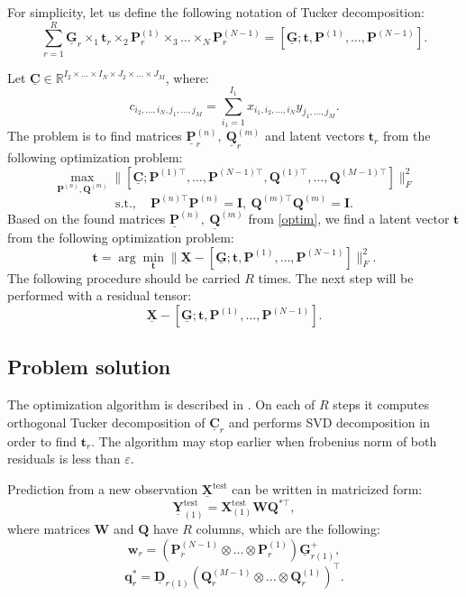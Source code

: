 \documentclass[../../main.tex]{subfiles}
\begin{document}
For simplicity, let us define the following notation of Tucker decomposition:
\[
 \sum_{r=1}^R\underline{\mathbf{G}}_r\times_1\mathbf{t}_r\times_2\mathbf{P}^{(1)}_r\times_3\ldots \times_N\mathbf{P}_r^{(N - 1)} = [\underline{\mathbf{G}};\mathbf{t}, \mathbf{P}^{(1)}, \ldots, \mathbf{P}^{(N-1)}].
\]

Let $\underline{\mathbf{C}} \in \mathbb{R}^{I_2\times\ldots\times I_N\times J_2\times\ldots\times J_M}$, where:
\[
c_{i_2, \ldots, i_N, j_1, \ldots, j_M} = \sum_{i_1 = 1}^{I_1}x_{i_1, i_2, \ldots, i_N}y_{j_1, \ldots, j_M}.
\]
The problem is to find matrices $\underline{\mathbf{P}}_r^{(n)}, ~\underline{\mathbf{Q}}_r^{(m)}$ and latent vectors $\mathbf{t}_r$ from the following optimization problem:
\begin{equation}
\label{optim}
\max_{\mathbf{P}^{(n)}, \mathbf{Q}^{(m)}}\|[\underline{\mathbf{C}};\mathbf{P}^{(1)\top},\ldots,\mathbf{P}^{(N-1)\top}, \mathbf{Q}^{(1)\top}, \ldots, \mathbf{Q}^{(M-1)\top}]\|_F^2
\end{equation}
\begin{equation}
\mathrm{s.t.}, \quad \mathbf{P}^{(n)\top}\mathbf{P}^{(n)} = \mathbf{I}, ~\mathbf{Q}^{(m)\top}\mathbf{Q}^{(m)} = \mathbf{I}.
\end{equation}
Based on the found matrices $\underline{\mathbf{P}}^{(n)}, ~\underline{\mathbf{Q}}^{(m)}$ from \eqref{optim}, we find a latent vector $\mathbf{t}$ from the following optimization problem:
\begin{equation}
\mathbf{t} = \arg\min_{\mathbf{t}}\|\underline{\mathbf{X}} - [\underline{\mathbf{G}}; \mathbf{t}, \mathbf{P}^{(1)}, \ldots, \mathbf{P}^{(N - 1)}]\|_F^2.
\end{equation}
The following procedure should be carried $R$ times. The next step will be performed with a residual tensor:
\[
\underline{\mathbf{X}} - [\underline{\mathbf{G}}; \mathbf{t}, \mathbf{P}^{(1)}, \ldots, \mathbf{P}^{(N - 1)}].
\]

\subsection{Problem solution}
The optimization algorithm is described in \cite{zhao2012higher}. On each of $R$ steps it  computes orthogonal Tucker decomposition of $\underline{\mathbf{C}}_r$ and performs SVD decomposition in order to find $\mathbf{t}_r$. The algorithm may stop earlier when frobenius norm of both residuals is less than $\varepsilon$.

Prediction from a new observation $\underline{\mathbf{X}}^\text{test}$ can be written in matricized form:
\begin{equation}
\underline{\mathbf{Y}}_{(1)}^{\text{test}} = \mathbf{X}_{(1)}^\text{test}\mathbf{W}\mathbf{Q}^{*\top},
\end{equation}
where matrices $\mathbf{W}$ and $\mathbf{Q}$ have $R$ columns, which are the following:
\[
\mathbf{w}_r = (\mathbf{P}_r^{(N-1)}\otimes\ldots\otimes \mathbf{P}_r^{(1)})\underline{\mathbf{G}}_{r(1)}^+,
\]
\[
\mathbf{q}_r^* = \underline{\mathbf{D}}_{r(1)}(\mathbf{Q}_r^{(M-1)}\otimes\ldots\otimes\mathbf{Q}_r^{(1)})^\top.
\]
\end{document}
